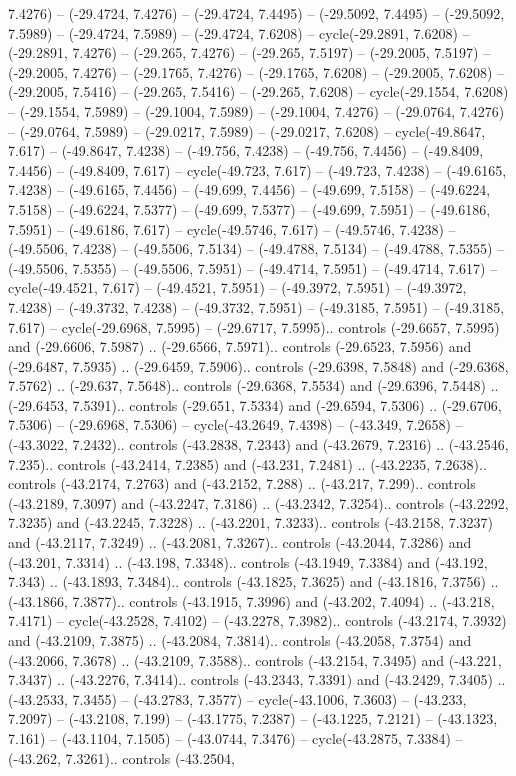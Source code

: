 \begin{scope}[shift={(2.5552, 9.9912)}]
\begin{scope}[shift={(48.1654, -14.8546)}]
7.4276) -- (-29.4724, 7.4276) -- (-29.4724, 7.4495) -- (-29.5092, 7.4495) -- (-29.5092, 7.5989) -- (-29.4724, 7.5989) -- (-29.4724, 7.6208) -- cycle(-29.2891, 7.6208) -- (-29.2891, 7.4276) -- (-29.265, 7.4276) -- (-29.265, 7.5197) -- (-29.2005, 7.5197) -- (-29.2005, 7.4276) -- (-29.1765, 7.4276) -- (-29.1765, 7.6208) -- (-29.2005, 7.6208) -- (-29.2005, 7.5416) -- (-29.265, 7.5416) -- (-29.265, 7.6208) -- cycle(-29.1554, 7.6208) -- (-29.1554, 7.5989) -- (-29.1004, 7.5989) -- (-29.1004, 7.4276) -- (-29.0764, 7.4276) -- (-29.0764, 7.5989) -- (-29.0217, 7.5989) -- (-29.0217, 7.6208) -- cycle(-49.8647, 7.617) -- (-49.8647, 7.4238) -- (-49.756, 7.4238) -- (-49.756, 7.4456) -- (-49.8409, 7.4456) -- (-49.8409, 7.617) -- cycle(-49.723, 7.617) -- (-49.723, 7.4238) -- (-49.6165, 7.4238) -- (-49.6165, 7.4456) -- (-49.699, 7.4456) -- (-49.699, 7.5158) -- (-49.6224, 7.5158) -- (-49.6224, 7.5377) -- (-49.699, 7.5377) -- (-49.699, 7.5951) -- (-49.6186, 7.5951) -- (-49.6186, 7.617) -- cycle(-49.5746, 7.617) -- (-49.5746, 7.4238) -- (-49.5506, 7.4238) -- (-49.5506, 7.5134) -- (-49.4788, 7.5134) -- (-49.4788, 7.5355) -- (-49.5506, 7.5355) -- (-49.5506, 7.5951) -- (-49.4714, 7.5951) -- (-49.4714, 7.617) -- cycle(-49.4521, 7.617) -- (-49.4521, 7.5951) -- (-49.3972, 7.5951) -- (-49.3972, 7.4238) -- (-49.3732, 7.4238) -- (-49.3732, 7.5951) -- (-49.3185, 7.5951) -- (-49.3185, 7.617) -- cycle(-29.6968, 7.5995) -- (-29.6717, 7.5995).. controls (-29.6657, 7.5995) and (-29.6606, 7.5987) .. (-29.6566, 7.5971).. controls (-29.6523, 7.5956) and (-29.6487, 7.5935) .. (-29.6459, 7.5906).. controls (-29.6398, 7.5848) and (-29.6368, 7.5762) .. (-29.637, 7.5648).. controls (-29.6368, 7.5534) and (-29.6396, 7.5448) .. (-29.6453, 7.5391).. controls (-29.651, 7.5334) and (-29.6594, 7.5306) .. (-29.6706, 7.5306) -- (-29.6968, 7.5306) -- cycle(-43.2649, 7.4398) -- (-43.349, 7.2658) -- (-43.3022, 7.2432).. controls (-43.2838, 7.2343) and (-43.2679, 7.2316) .. (-43.2546, 7.235).. controls (-43.2414, 7.2385) and (-43.231, 7.2481) .. (-43.2235, 7.2638).. controls (-43.2174, 7.2763) and (-43.2152, 7.288) .. (-43.217, 7.299).. controls (-43.2189, 7.3097) and (-43.2247, 7.3186) .. (-43.2342, 7.3254).. controls (-43.2292, 7.3235) and (-43.2245, 7.3228) .. (-43.2201, 7.3233).. controls (-43.2158, 7.3237) and (-43.2117, 7.3249) .. (-43.2081, 7.3267).. controls (-43.2044, 7.3286) and (-43.201, 7.3314) .. (-43.198, 7.3348).. controls (-43.1949, 7.3384) and (-43.192, 7.343) .. (-43.1893, 7.3484).. controls (-43.1825, 7.3625) and (-43.1816, 7.3756) .. (-43.1866, 7.3877).. controls (-43.1915, 7.3996) and (-43.202, 7.4094) .. (-43.218, 7.4171) -- cycle(-43.2528, 7.4102) -- (-43.2278, 7.3982).. controls (-43.2174, 7.3932) and (-43.2109, 7.3875) .. (-43.2084, 7.3814).. controls (-43.2058, 7.3754) and (-43.2066, 7.3678) .. (-43.2109, 7.3588).. controls (-43.2154, 7.3495) and (-43.221, 7.3437) .. (-43.2276, 7.3414).. controls (-43.2343, 7.3391) and (-43.2429, 7.3405) .. (-43.2533, 7.3455) -- (-43.2783, 7.3577) -- cycle(-43.1006, 7.3603) -- (-43.233, 7.2097) -- (-43.2108, 7.199) -- (-43.1775, 7.2387) -- (-43.1225, 7.2121) -- (-43.1323, 7.161) -- (-43.1104, 7.1505) -- (-43.0744, 7.3476) -- cycle(-43.2875, 7.3384) -- (-43.262, 7.3261).. controls (-43.2504, 
\end{scope}
\end{scope}
